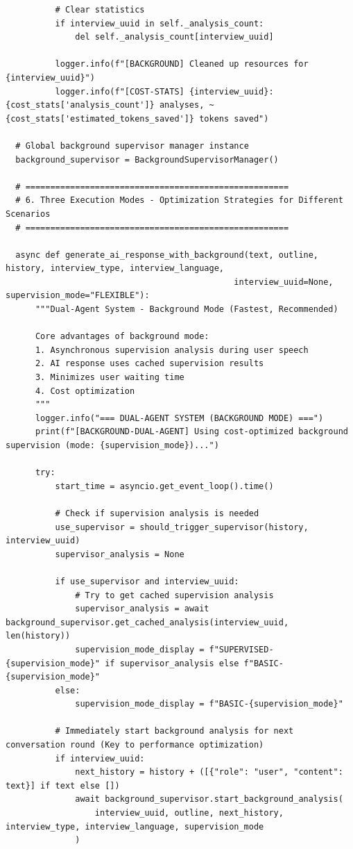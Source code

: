 \documentclass[sigchi,nonacm,manuscript]{acmart}
\begin{document}
\begin{lstlisting}
          # Clear statistics
          if interview_uuid in self._analysis_count:
              del self._analysis_count[interview_uuid]
          
          logger.info(f"[BACKGROUND] Cleaned up resources for {interview_uuid}")
          logger.info(f"[COST-STATS] {interview_uuid}: {cost_stats['analysis_count']} analyses, ~{cost_stats['estimated_tokens_saved']} tokens saved")

  # Global background supervisor manager instance
  background_supervisor = BackgroundSupervisorManager()

  # =====================================================
  # 6. Three Execution Modes - Optimization Strategies for Different Scenarios
  # =====================================================

  async def generate_ai_response_with_background(text, outline, history, interview_type, interview_language, 
                                              interview_uuid=None, supervision_mode="FLEXIBLE"):
      """Dual-Agent System - Background Mode (Fastest, Recommended)
      
      Core advantages of background mode:
      1. Asynchronous supervision analysis during user speech
      2. AI response uses cached supervision results
      3. Minimizes user waiting time
      4. Cost optimization
      """
      logger.info("=== DUAL-AGENT SYSTEM (BACKGROUND MODE) ===")
      print(f"[BACKGROUND-DUAL-AGENT] Using cost-optimized background supervision (mode: {supervision_mode})...")
      
      try:
          start_time = asyncio.get_event_loop().time()
          
          # Check if supervision analysis is needed
          use_supervisor = should_trigger_supervisor(history, interview_uuid)
          supervisor_analysis = None
          
          if use_supervisor and interview_uuid:
              # Try to get cached supervision analysis
              supervisor_analysis = await background_supervisor.get_cached_analysis(interview_uuid, len(history))
              supervision_mode_display = f"SUPERVISED-{supervision_mode}" if supervisor_analysis else f"BASIC-{supervision_mode}"
          else:
              supervision_mode_display = f"BASIC-{supervision_mode}"
          
          # Immediately start background analysis for next conversation round (Key to performance optimization)
          if interview_uuid:
              next_history = history + ([{"role": "user", "content": text}] if text else [])
              await background_supervisor.start_background_analysis(
                  interview_uuid, outline, next_history, interview_type, interview_language, supervision_mode
              )
          

\end{lstlisting}
\end{document}
